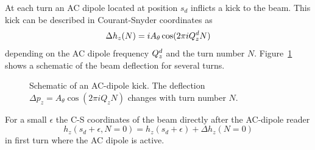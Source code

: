 At each turn an AC dipole located at position $s_d$ inflicts a kick to the beam. This kick can be
described in Courant-Snyder coordinates as
%
\begin{equation}
    \Delta h_z(N) = i A_\theta \cos(2\pi i Q^{d}_{z} N)
\end{equation}
%
depending on the AC dipole frequency $Q^{d}_{z}$ and the turn number $N$. Figure~\ref{fig_ac_kick} shows
a schematic of the beam deflection for several turns.
%
\begin{figure}[h]
    \centering
    
    \caption{
        Schematic of an AC-dipole kick. The deflection $\Delta p_z = A_\theta\cos(2\pi i Q_z N)$
        changes with turn number $N$.}
    \label{fig_ac_kick}
\end{figure}
%
For a small $\epsilon$ the C-S coordinates of the beam directly after the AC-dipole reader
%
\begin{equation}
    h_z(s_d + \epsilon, N=0) = h_z(s_d+\epsilon) + \Delta h_z(N=0)
    \label{eq_ackick}
\end{equation}
%
in first turn where the AC dipole is active.

